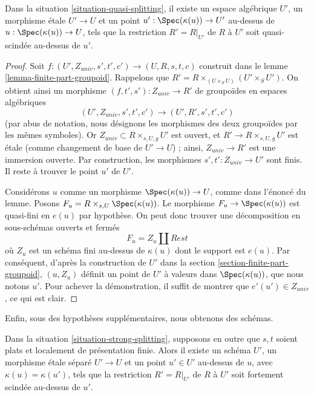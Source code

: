 \begin{lemma}
\label{lemma-quasi-splitting}
Dans la situation \ref{situation-quasi-splitting},
il existe un espace algébrique $U'$, un morphisme \'etale
$U' \to U$ et un point $u' : \Spec(\kappa(u)) \to U'$
au-dessus de $u : \Spec(\kappa(u)) \to U$,
tels que la restriction $R' = R|_{U'}$ de $R$ à $U'$
soit quasi-scindée au-dessus de $u'$.
\end{lemma}

\begin{proof}
Soit $f : (U', Z_{univ}, s', t', c') \to (U, R, s, t, c)$ construit dans le
lemme \ref{lemma-finite-part-groupoid}.
Rappelons que $R' = R \times_{(U \times_S U)} (U' \times_S U')$.
On obtient ainsi un morphisme $(f, t', s') : Z_{univ} \to R'$ de groupoïdes
en espaces algébriques
$$
(U', Z_{univ}, s', t', c') \to (U', R', s', t', c')
$$
(par abus de notation, nous désignons les morphismes des deux groupoïdes
par les mêmes symboles). Or $Z_{univ} \subset R \times_{s, U, g} U'$ est ouvert,
et $R' \to R \times_{s, U, g} U'$ est \'etale (comme changement de base
de $U' \to U$) ; ainsi, $Z_{univ} \to R'$ est une immersion ouverte.
Par construction, les morphismes $s', t' : Z_{univ} \to U'$ sont finis.
Il reste à trouver le point $u'$ de $U'$.

\medskip\noindent
Considérons $u$ comme un morphisme $\Spec(\kappa(u)) \to U$, comme dans
l'énoncé du lemme. Posons $F_u = R \times_{s, U} \Spec(\kappa(u))$.
Le morphisme $F_u \to \Spec(\kappa(u))$ est quasi-fini en $e(u)$
par hypothèse. On peut donc trouver une décomposition en sous-schémas
ouverts et fermés
$$
F_u = Z_u \amalg Rest
$$
où $Z_u$ est un schéma fini au-dessus de $\kappa(u)$ dont le support est $e(u)$.
Par conséquent, d'après la construction de $U'$ dans la
section \ref{section-finite-part-groupoid},
$(u, Z_u)$ définit un point de $U'$ à valeurs dans
$\Spec(\kappa(u))$, que nous notons $u'$. Pour achever la démonstration,
il suffit de montrer que $e'(u') \in Z_{univ}$, ce qui est clair.
\end{proof}

\noindent
Enfin, sous des hypothèses supplémentaires, nous obtenons des schémas.

\begin{lemma}
\label{lemma-strong-splitting-scheme}
Dans la situation \ref{situation-strong-splitting}, supposons en outre que
$s, t$ soient plats et localement de présentation finie.
Alors il existe un schéma $U'$, un morphisme \'etale séparé
$U' \to U$ et un point $u' \in U'$
au-dessus de $u$, avec $\kappa(u) = \kappa(u')$,
tels que la restriction $R' = R|_{U'}$ de $R$ à $U'$
soit fortement scindée au-dessus de $u'$.
\end{lemma}

